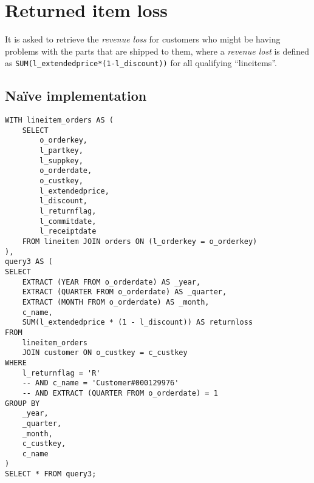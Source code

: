 

\section{Returned item loss}

It is asked to retrieve the \textit{revenue loss} for customers who might be having problems with the parts that are shipped to them, where a \textit{revenue lost} is defined as \texttt{SUM(l\_extendedprice*(1-l\_discount))} for all qualifying ``lineitems''.

\subsection{Na\"{i}ve implementation}

\begin{lstlisting}
WITH lineitem_orders AS (
	SELECT 
		o_orderkey, 
		l_partkey, 
		l_suppkey, 
		o_orderdate, 
		o_custkey, 
		l_extendedprice, 
		l_discount, 
		l_returnflag,
		l_commitdate,
		l_receiptdate
	FROM lineitem JOIN orders ON (l_orderkey = o_orderkey)
),
query3 AS (
SELECT
	EXTRACT (YEAR FROM o_orderdate) AS _year,
	EXTRACT (QUARTER FROM o_orderdate) AS _quarter,
	EXTRACT (MONTH FROM o_orderdate) AS _month,
	c_name,
	SUM(l_extendedprice * (1 - l_discount)) AS returnloss
FROM
	lineitem_orders
	JOIN customer ON o_custkey = c_custkey
WHERE 
	l_returnflag = 'R'
	-- AND c_name = 'Customer#000129976'
	-- AND EXTRACT (QUARTER FROM o_orderdate) = 1
GROUP BY
	_year,
	_quarter,
	_month,
	c_custkey,
	c_name
)
SELECT * FROM query3;
\end{lstlisting}
